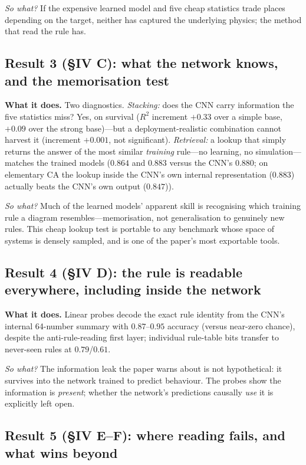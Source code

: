 \documentclass[11pt,a4paper]{article}
\newcommand{\sowhat}[1]{\emph{So what?} #1}
\begin{document}
\sowhat{If the expensive learned model and five cheap statistics trade
places depending on the target, neither has captured the underlying physics;
the method that read the rule has.}

\subsection*{Result 3 (\S IV C): what the network knows, and the memorisation test}

\textbf{What it does.} Two diagnostics. \emph{Stacking:} does the CNN carry
information the five statistics miss? Yes, on survival ($R^2$ increment
$+0.33$ over a simple base, $+0.09$ over the strong base)---but a
deployment-realistic combination cannot harvest it (increment $+0.001$, not
significant). \emph{Retrieval:} a lookup that simply returns the answer of
the most similar \emph{training} rule---no learning, no simulation---matches
the trained models ($0.864$ and $0.883$ versus the CNN's $0.880$; on
elementary CA the lookup inside the CNN's own internal representation
($0.883$) actually beats the CNN's own output ($0.847$)).

\sowhat{Much of the learned models' apparent skill is recognising which
training rule a diagram resembles---memorisation, not generalisation to
genuinely new rules. This cheap lookup test is portable to any benchmark
whose space of systems is densely sampled, and is one of the paper's most
exportable tools.}

\subsection*{Result 4 (\S IV D): the rule is readable everywhere, including inside the network}

\textbf{What it does.} Linear probes decode the exact rule identity from the
CNN's internal 64-number summary with $0.87$--$0.95$ accuracy (versus
near-zero chance), despite the anti-rule-reading first layer; individual
rule-table bits transfer to never-seen rules at $0.79$/$0.61$.

\sowhat{The information leak the paper warns about is not hypothetical: it
survives into the network trained to predict behaviour. The probes show the
information is \emph{present}; whether the network's predictions causally
\emph{use} it is explicitly left open.}

\subsection*{Result 5 (\S IV E--F): where reading fails, and what wins beyond}
\end{document}
